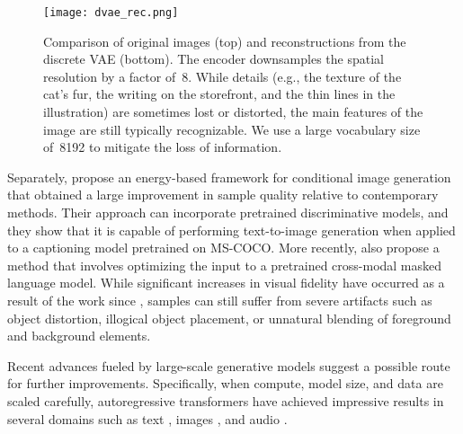 \documentclass{article}
\begin{document}
\begin{figure}
    \centering
    \texttt{[image: dvae\_rec.png]}
    \caption{Comparison of original images (top) and reconstructions from the discrete VAE (bottom). The encoder downsamples the spatial resolution by a factor of~8. While details (e.g., the texture of the cat's fur, the writing on the storefront, and the thin lines in the illustration) are sometimes lost or distorted, the main features of the image are still typically recognizable. We use a large vocabulary size of~8192 to mitigate the loss of information.}
    \label{fig:dvae_rec}
\end{figure}
Separately, \citet{nguyen2017plug} propose an energy-based framework for conditional image generation that obtained a large improvement in sample quality relative to contemporary methods. Their approach can incorporate pretrained discriminative models, and they show that it is capable of performing text-to-image generation when applied to a captioning model pretrained on MS-COCO.
More recently, \citet{cho2020x} also propose a method that involves optimizing the input to a pretrained cross-modal masked language model. While significant increases in visual fidelity have occurred as a result of the work since \citet{mansimov2015generating}, samples can still suffer from severe artifacts such as object distortion, illogical object placement, or unnatural blending of foreground and background elements.

Recent advances fueled by large-scale generative models suggest a possible route for further improvements. Specifically, when compute, model size, and data are scaled carefully, autoregressive transformers \citep{vaswani2017attention} have achieved impressive results in several domains such as text \citep{radford2019language}, images \citep{chen2020generative}, and audio \citep{dhariwal2020jukebox}.
\end{document}
